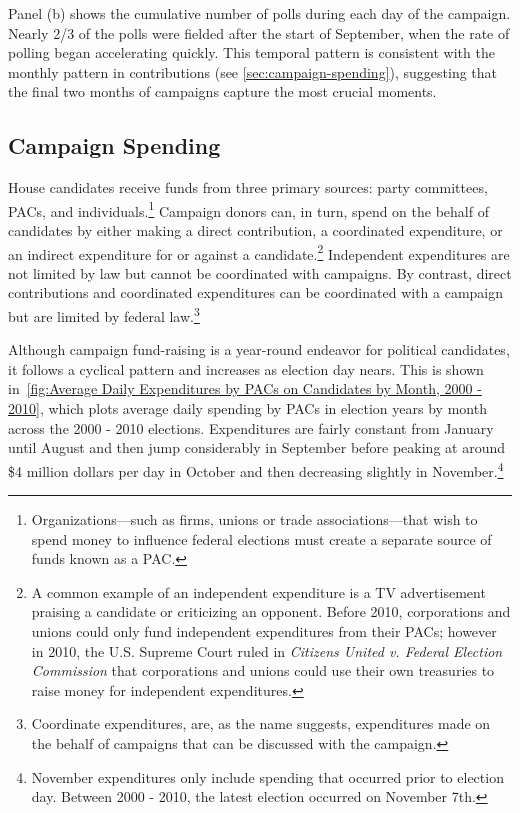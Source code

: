 \documentclass[12pt,final,fleqn]{article}
\theoremstyle{plain}
\begin{document}
Panel (b) shows the cumulative number of polls during each day of the campaign. Nearly 2/3 of the polls were fielded after the start of September, when the rate of polling began accelerating quickly. This temporal pattern is consistent with the monthly pattern in contributions (see \autoref{sec:campaign-spending}), suggesting that the final two months of campaigns capture the most crucial moments.

\subsection{Campaign Spending} 
\label{sec:campaign-spending}
House candidates receive funds from three primary sources: party committees, PACs, and individuals.\footnote{Organizations---such as firms, unions or trade associations---that wish to spend money to influence federal elections must create a separate source of funds known as a PAC.} Campaign donors can, in turn, spend on the behalf of candidates by either making a direct contribution, a coordinated expenditure, or an indirect expenditure for or against a candidate.\footnote{A common example of an independent expenditure is a TV advertisement praising a candidate or criticizing an opponent. Before 2010, corporations and unions could only fund independent expenditures from their PACs; however in 2010, the U.S. Supreme Court ruled in \emph{Citizens United v. Federal Election Commission} that corporations and unions could use their own treasuries to raise money for independent expenditures.} Independent expenditures are not limited by law but cannot be coordinated with campaigns. By contrast, direct contributions and coordinated expenditures can be coordinated with a campaign but are limited by federal law.\footnote{Coordinate expenditures, are, as the name suggests, expenditures made on the behalf of campaigns that can be discussed with the campaign.}

Although campaign fund-raising is a year-round endeavor for political candidates, it follows a cyclical pattern and increases as election day nears. This is shown in~\autoref{fig:Average Daily Expenditures by PACs on Candidates by Month, 2000 - 2010}, which plots average daily spending by PACs in election years by month across the 2000 - 2010 elections. Expenditures are fairly constant from January until August and then jump considerably in September before peaking at around \$4 million dollars per day in October and then decreasing slightly in November.\footnote{November expenditures only include spending that occurred prior to election day. Between 2000 - 2010, the latest election occurred on November 7th.} 
\end{document}
